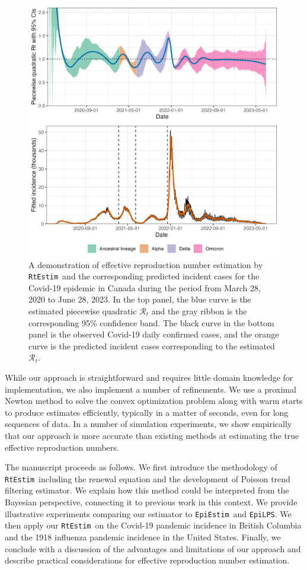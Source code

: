 \documentclass[10pt,letterpaper]{article}
\def\RtEstim{\texttt{RtEstim}}
\def\EpiEstim{\texttt{EpiEstim}}
\def\EpiLPS{\texttt{EpiLPS}}
\def\calR{\mathcal{R}}
\begin{document}
\begin{figure}[!ht]
  \centering
  \includegraphics[width=.9\textwidth]{fig/intro-fig-new.png}
  \caption{A demonstration of effective reproduction number estimation 
  by \RtEstim\ and the corresponding predicted incident cases for the Covid-19 epidemic 
  in Canada during the period from March 28, 2020 to June 28, 2023. 
  In the top panel, the blue curve is the estimated piecewise
  quadratic $\calR_t$ and the gray ribbon is the corresponding 95\% confidence band. 
  The black curve in the bottom panel is the observed Covid-19 daily confirmed 
  cases, and the orange curve is the predicted incident cases
  corresponding to the estimated $\calR_t$.}
  \label{fig:intro-fig}
\end{figure}

While our approach is straightforward and requires little domain knowledge for
implementation, we also implement a number of refinements. 
We use a proximal Newton method to solve the convex optimization problem along
with warm starts to produce estimates efficiently, typically in a matter of 
seconds, even for long sequences of data. In a number of simulation experiments, 
we show empirically that our approach is more accurate than existing methods at 
estimating the true effective reproduction numbers. 


The manuscript proceeds as follows. We first introduce the methodology of
\RtEstim\ including the renewal equation and the development of Poisson
trend filtering estimator. We explain how this method could be interpreted from
the Bayesian perspective, connecting it to previous work in this context. We
provide illustrative experiments comparing our estimator to \EpiEstim\ and
\EpiLPS. We then apply our \RtEstim\ on the Covid-19 pandemic incidence in
British Columbia and the 1918 influenza pandemic incidence in the United States. 
Finally, we conclude with a discussion of the advantages and limitations of our 
approach and describe practical considerations for effective reproduction number
estimation.
\end{document}
